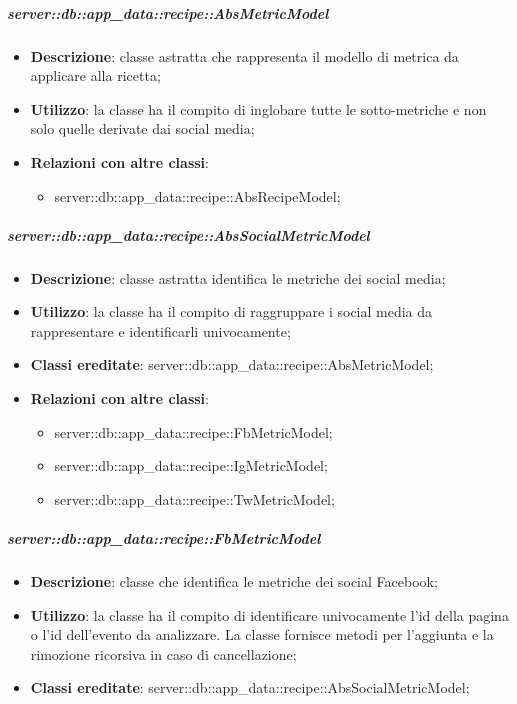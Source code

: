 		\subparagraph{server::db::app\_data::recipe::AbsMetricModel} %
		\label{subp:server_db_app_data_recipe_absmetricmodel}
			\begin{itemize}
				\item \textbf{Descrizione}: classe astratta che rappresenta il modello di metrica da applicare alla ricetta;
				\item \textbf{Utilizzo}: la classe ha il compito di inglobare tutte le sotto-metriche e non solo quelle derivate dai social media;
				\item \textbf{Relazioni con altre classi}:
					\begin{itemize}
						\item server::db::app\_data::recipe::AbsRecipeModel;
					\end{itemize}
			\end{itemize}


		\subparagraph{server::db::app\_data::recipe::AbsSocialMetricModel} %
		\label{subp:server_db_app_data_recipe_abssocialmetricmodel}
			\begin{itemize}
				\item \textbf{Descrizione}: classe astratta identifica le metriche dei social media;
				\item \textbf{Utilizzo}: la classe ha il compito di raggruppare i social media da rappresentare e identificarli univocamente;
				\item \textbf{Classi ereditate}: server::db::app\_data::recipe::AbsMetricModel;
				\item \textbf{Relazioni con altre classi}:
					\begin{itemize}
						\item server::db::app\_data::recipe::FbMetricModel;
						\item server::db::app\_data::recipe::IgMetricModel;
						\item server::db::app\_data::recipe::TwMetricModel;
					\end{itemize}
			\end{itemize}


		\subparagraph{server::db::app\_data::recipe::FbMetricModel} %
		\label{subp:server_db_app_data_recipe_fbmetricmodel}
			\begin{itemize}
				\item \textbf{Descrizione}: classe che identifica le metriche dei social Facebook;
				\item \textbf{Utilizzo}: la classe ha il compito di identificare univocamente l'id della pagina o l'id dell'evento da analizzare. La classe fornisce metodi per l'aggiunta e la rimozione ricorsiva in caso di cancellazione;
				\item \textbf{Classi ereditate}: server::db::app\_data::recipe::AbsSocialMetricModel;
			\end{itemize}


